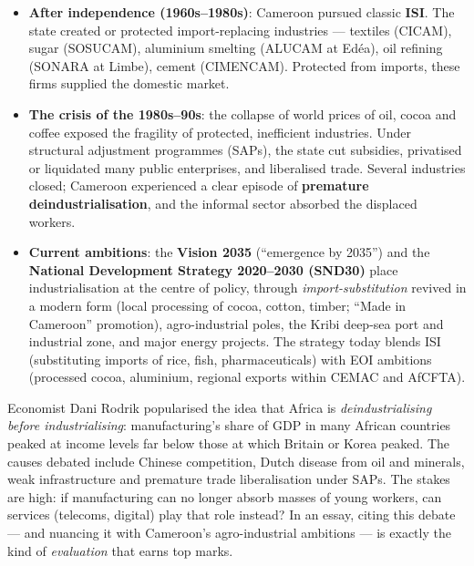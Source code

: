 \documentclass[11pt]{article}
\begin{document}
\begin{itemize}
\item \textbf{After independence (1960s--1980s)}: Cameroon pursued classic \textbf{ISI}. The state created or protected import-replacing industries — textiles (CICAM), sugar (SOSUCAM), aluminium smelting (ALUCAM at Edéa), oil refining (SONARA at Limbe), cement (CIMENCAM). Protected from imports, these firms supplied the domestic market.
\item \textbf{The crisis of the 1980s--90s}: the collapse of world prices of oil, cocoa and coffee exposed the fragility of protected, inefficient industries. Under structural adjustment programmes (SAPs), the state cut subsidies, privatised or liquidated many public enterprises, and liberalised trade. Several industries closed; Cameroon experienced a clear episode of \textbf{premature deindustrialisation}, and the informal sector absorbed the displaced workers.
\item \textbf{Current ambitions}: the \textbf{Vision 2035} (``emergence by 2035'') and the \textbf{National Development Strategy 2020--2030 (SND30)} place industrialisation at the centre of policy, through \emph{import-substitution} revived in a modern form (local processing of cocoa, cotton, timber; ``Made in Cameroon'' promotion), agro-industrial poles, the Kribi deep-sea port and industrial zone, and major energy projects. The strategy today blends ISI (substituting imports of rice, fish, pharmaceuticals) with EOI ambitions (processed cocoa, aluminium, regional exports within CEMAC and AfCFTA).
\end{itemize}

\begin{savaistu}
Economist Dani Rodrik popularised the idea that Africa is \emph{deindustrialising before industrialising}: manufacturing's share of GDP in many African countries peaked at income levels far below those at which Britain or Korea peaked. The causes debated include Chinese competition, Dutch disease from oil and minerals, weak infrastructure and premature trade liberalisation under SAPs. The stakes are high: if manufacturing can no longer absorb masses of young workers, can services (telecoms, digital) play that role instead? In an essay, citing this debate — and nuancing it with Cameroon's agro-industrial ambitions — is exactly the kind of \emph{evaluation} that earns top marks.
\end{savaistu}
\end{document}
